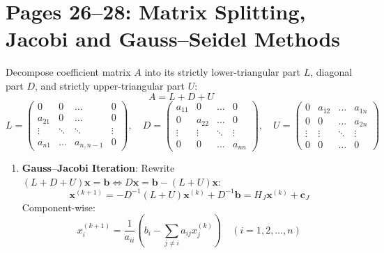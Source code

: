 \section{Pages 26--28: Matrix Splitting, Jacobi and Gauss--Seidel Methods}
\label{sec:iterative_linear_methods}

\begin{theorembox}
Decompose coefficient matrix $A$ into its strictly lower-triangular part $L$, diagonal part $D$, and strictly upper-triangular part $U$:
\begin{equation}
    A = L + D + U
\end{equation}
\begin{equation}
    L = \begin{pmatrix} 0 & 0 & \dots & 0 \\ a_{21} & 0 & \dots & 0 \\ \vdots & \ddots & \ddots & \vdots \\ a_{n1} & \dots & a_{n,n-1} & 0 \end{pmatrix}, \quad
    D = \begin{pmatrix} a_{11} & 0 & \dots & 0 \\ 0 & a_{22} & \dots & 0 \\ \vdots & \vdots & \ddots & \vdots \\ 0 & 0 & \dots & a_{nn} \end{pmatrix}, \quad
    U = \begin{pmatrix} 0 & a_{12} & \dots & a_{1n} \\ 0 & 0 & \dots & a_{2n} \\ \vdots & \vdots & \ddots & \vdots \\ 0 & 0 & \dots & 0 \end{pmatrix}
\end{equation}
\begin{enumerate}
    \item \textbf{Gauss--Jacobi Iteration}:
    Rewrite $(L + D + U)\mathbf{x} = \mathbf{b} \iff D \mathbf{x} = \mathbf{b} - (L + U)\mathbf{x}$:
    \begin{equation}
        \boxed{\mathbf{x}^{(k+1)} = -D^{-1}(L + U)\mathbf{x}^{(k)} + D^{-1}\mathbf{b} = H_J \mathbf{x}^{(k)} + \mathbf{c}_J}
    \end{equation}
    Component-wise:
    \begin{equation}
        \boxed{x_i^{(k+1)} = \frac{1}{a_{ii}}\left( b_i - \sum_{j \ne i} a_{ij} x_j^{(k)} \right)} \quad (i = 1, 2, \dots, n)
    \end{equation}

\end{enumerate}
\end{theorembox}
